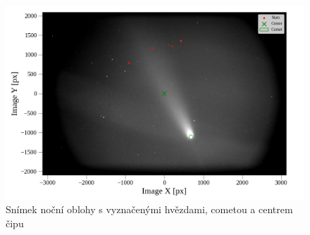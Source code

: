 \documentclass[a4paper,11pt]{article}
\begin{document}
\newpage
            \begin{figure}[H]
                \centering
                \includegraphics[scale=0.6]{barnard_sky}
                \captionsetup{justification=centering, font=footnotesize}
                \caption{Snímek noční oblohy s vyznačenými hvězdami, cometou a centrem čipu}
                \label{fig:barnard_sky}
            \end{figure}
\end{document}
